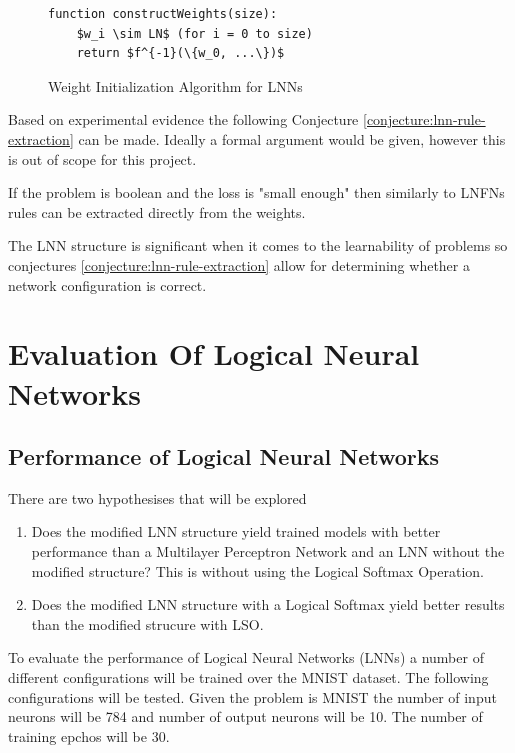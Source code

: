 \begin{figure}[H]
	\begin{lstlisting}[mathescape=true]
  function constructWeights(size):
    $w_i \sim LN$ (for i = 0 to size)
    return $f^{-1}(\{w_0, ...\})$
	\end{lstlisting}
	\caption{Weight Initialization Algorithm for LNNs}
	\label{alg:lnn-initlization}
\end{figure}

Based on experimental evidence the following Conjecture \ref{conjecture:lnn-rule-extraction} can be made. Ideally a formal argument would be given, however this is out of scope for this project.

\begin{conjecture}
	If the problem is boolean and the loss is "small enough" then similarly to LNFNs rules can be extracted directly from the weights.
	\label{conjecture:lnn-rule-extraction}
\end{conjecture}

The LNN structure is significant when it comes to the learnability of problems so conjectures \ref{conjecture:lnn-rule-extraction} allow for determining whether a network configuration is correct.


\chapter{Evaluation Of Logical Neural Networks} \label{C:evaluation-lnn}
\section{Performance of Logical Neural Networks} \label{sec:lnn-eval-peformance}
There are two hypothesises that will be explored

\begin{enumerate}
	\item Does the modified LNN structure yield trained models with better performance than a Multilayer Perceptron Network and an LNN without the modified structure? This is without using the Logical Softmax Operation.
	\item Does the modified LNN structure with a Logical Softmax yield better results than the modified strucure with LSO.
\end{enumerate}

To evaluate the performance of Logical Neural Networks (LNNs) a number of different configurations will be trained over the MNIST dataset. The following configurations will be tested. Given the problem is MNIST the number of input neurons will be 784 and number of output neurons will be 10. The number of training epchos will be 30.\\

